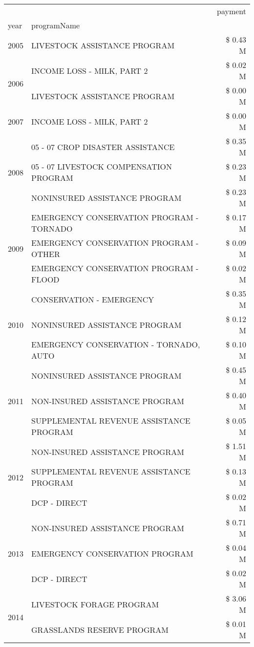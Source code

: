 \begin{tabular}{llr}
\toprule
 &  & payment \\
year & programName &  \\
\midrule
2005 & LIVESTOCK ASSISTANCE PROGRAM & \$ 0.43 M \\
\cline{1-3}
\multirow[t]{2}{*}{2006} & INCOME LOSS - MILK, PART 2 & \$ 0.02 M \\
 & LIVESTOCK ASSISTANCE PROGRAM & \$ 0.00 M \\
\cline{1-3}
2007 & INCOME LOSS - MILK, PART 2 & \$ 0.00 M \\
\cline{1-3}
\multirow[t]{3}{*}{2008} & 05 - 07 CROP DISASTER ASSISTANCE & \$ 0.35 M \\
 & 05 - 07 LIVESTOCK COMPENSATION PROGRAM & \$ 0.23 M \\
 & NONINSURED ASSISTANCE PROGRAM & \$ 0.23 M \\
\cline{1-3}
\multirow[t]{3}{*}{2009} & EMERGENCY CONSERVATION PROGRAM - TORNADO & \$ 0.17 M \\
 & EMERGENCY CONSERVATION PROGRAM - OTHER & \$ 0.09 M \\
 & EMERGENCY CONSERVATION PROGRAM - FLOOD & \$ 0.02 M \\
\cline{1-3}
\multirow[t]{3}{*}{2010} & CONSERVATION - EMERGENCY & \$ 0.35 M \\
 & NONINSURED ASSISTANCE PROGRAM & \$ 0.12 M \\
 & EMERGENCY CONSERVATION - TORNADO, AUTO & \$ 0.10 M \\
\cline{1-3}
\multirow[t]{3}{*}{2011} & NONINSURED ASSISTANCE PROGRAM & \$ 0.45 M \\
 & NON-INSURED ASSISTANCE PROGRAM & \$ 0.40 M \\
 & SUPPLEMENTAL REVENUE ASSISTANCE PROGRAM & \$ 0.05 M \\
\cline{1-3}
\multirow[t]{3}{*}{2012} & NON-INSURED ASSISTANCE PROGRAM & \$ 1.51 M \\
 & SUPPLEMENTAL REVENUE ASSISTANCE PROGRAM & \$ 0.13 M \\
 & DCP - DIRECT & \$ 0.02 M \\
\cline{1-3}
\multirow[t]{3}{*}{2013} & NON-INSURED ASSISTANCE PROGRAM & \$ 0.71 M \\
 & EMERGENCY CONSERVATION PROGRAM & \$ 0.04 M \\
 & DCP - DIRECT & \$ 0.02 M \\
\cline{1-3}
\multirow[t]{3}{*}{2014} & LIVESTOCK FORAGE PROGRAM & \$ 3.06 M \\
 & GRASSLANDS RESERVE PROGRAM & \$ 0.01 M \\

\end{tabular}
